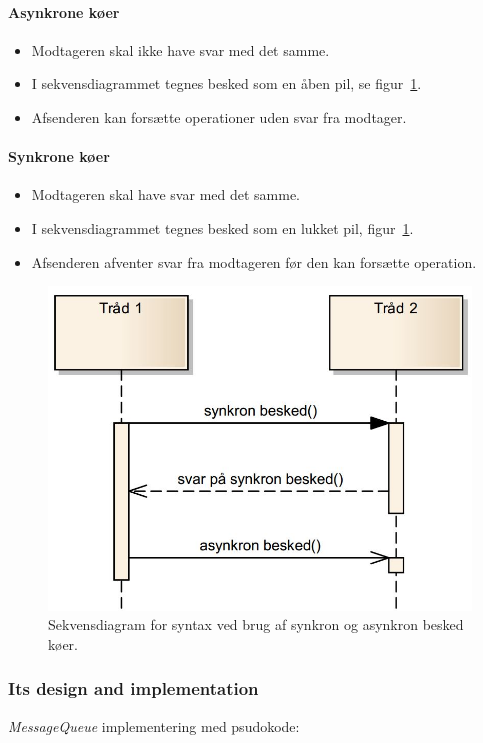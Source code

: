 \paragraph{Asynkrone køer}
\begin{itemize}
	\item Modtageren skal ikke have svar med det samme.
	\item I sekvensdiagrammet tegnes besked som en åben pil, se figur~\ref{fig:msq_seqdia}.
	\item Afsenderen kan forsætte operationer uden svar fra modtager.
\end{itemize}

\paragraph{Synkrone køer}
\begin{itemize}
	\item Modtageren skal have svar med det samme.
	\item I sekvensdiagrammet tegnes besked som en lukket pil, figur~\ref{fig:msq_seqdia}.
	\item Afsenderen afventer svar fra modtageren før den kan forsætte operation.
\end{itemize}

\begin{figure}[h]
	\centering
	\includegraphics[width=0.6\linewidth]{figs/spm3/msq_seqdia}
	\caption[Syntax for sekvensdiagram med syn -og asynkron msq.]{Sekvensdiagram for syntax ved brug af synkron og asynkron besked køer.}
	\label{fig:msq_seqdia}
\end{figure}

\subsubsection{Its design and implementation}
\textit{MessageQueue} implementering med psudokode:

